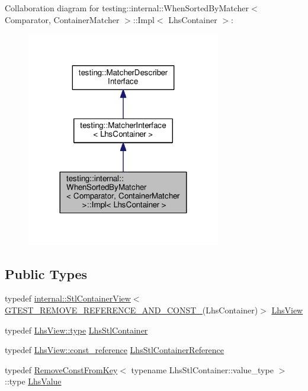 Collaboration diagram for testing\+:\+:internal\+:\+:When\+Sorted\+By\+Matcher$<$ Comparator, Container\+Matcher $>$\+:\+:Impl$<$ Lhs\+Container $>$\+:
\nopagebreak
\begin{figure}[H]
\begin{center}
\leavevmode
\includegraphics[width=240pt]{classtesting_1_1internal_1_1WhenSortedByMatcher_1_1Impl__coll__graph}
\end{center}
\end{figure}
\subsection*{Public Types}
\begin{DoxyCompactItemize}
\item 
typedef \hyperlink{classtesting_1_1internal_1_1StlContainerView}{internal\+::\+Stl\+Container\+View}$<$ \hyperlink{gtest-internal_8h_a874567b176266188fabfffb8393267ce}{G\+T\+E\+S\+T\+\_\+\+R\+E\+M\+O\+V\+E\+\_\+\+R\+E\+F\+E\+R\+E\+N\+C\+E\+\_\+\+A\+N\+D\+\_\+\+C\+O\+N\+S\+T\+\_\+}(Lhs\+Container)$>$ \hyperlink{classtesting_1_1internal_1_1WhenSortedByMatcher_1_1Impl_a4c84fddfe1bf967a73e5dae1940db427}{Lhs\+View}
\item 
typedef \hyperlink{classtesting_1_1internal_1_1StlContainerView_a2b2c63a6dcdbfe63fb0ee121ebf463ba}{Lhs\+View\+::type} \hyperlink{classtesting_1_1internal_1_1WhenSortedByMatcher_1_1Impl_a2cb1a8d85ca2c376b6abdbcb00d84759}{Lhs\+Stl\+Container}
\item 
typedef \hyperlink{classtesting_1_1internal_1_1StlContainerView_a9cd4f6ed689b3938cdb7b3c4cbf1b36b}{Lhs\+View\+::const\+\_\+reference} \hyperlink{classtesting_1_1internal_1_1WhenSortedByMatcher_1_1Impl_ab5e53a762bb213ccf84299b31c825b58}{Lhs\+Stl\+Container\+Reference}
\item 
typedef \hyperlink{structtesting_1_1internal_1_1RemoveConstFromKey}{Remove\+Const\+From\+Key}$<$ typename Lhs\+Stl\+Container\+::value\+\_\+type $>$\+::type \hyperlink{classtesting_1_1internal_1_1WhenSortedByMatcher_1_1Impl_a93044f4ba53373fcfc424132b5e6c462}{Lhs\+Value}
\end{DoxyCompactItemize}
